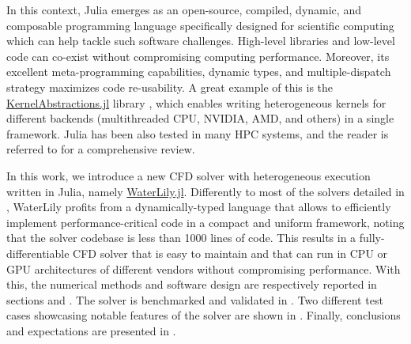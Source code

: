 \documentclass[10pt,a4paper]{article}
\begin{document}
In this context, Julia \citep{Bezanson2017} emerges as an open-source, compiled, dynamic, and composable programming language specifically designed for scientific computing which can help tackle such software challenges. High-level libraries and low-level code can co-exist without compromising computing performance. Moreover, its excellent meta-programming capabilities, dynamic types, and multiple-dispatch strategy maximizes code re-usability. A great example of this is the \href{https://github.com/JuliaGPU/KernelAbstractions.jl}{KernelAbstractions.jl} library \citep{Churavy2023}, which enables writing heterogeneous kernels for different backends (multithreaded CPU, NVIDIA, AMD, and others) in a single framework.
Julia has been also tested in many HPC systems, and the reader is referred to \cite{Churavy2022} for a comprehensive review.

In this work, we introduce a new CFD solver with heterogeneous execution written in Julia, namely \href{https://github.com/WaterLily-jl/WaterLily.jl}{WaterLily.jl}. Differently to most of the solvers detailed in , WaterLily profits from a dynamically-typed language that allows to efficiently implement performance-critical code in a compact and uniform framework, noting that the solver codebase is less than 1000 lines of code. This results in a fully-differentiable CFD solver that is easy to maintain and that can run in CPU or GPU architectures of different vendors without compromising performance. With this, the numerical methods and software design are respectively reported in sections  and . The solver is benchmarked and validated in . Two different test cases showcasing notable features of the solver are shown in . Finally, conclusions and expectations are presented in .
\end{document}
